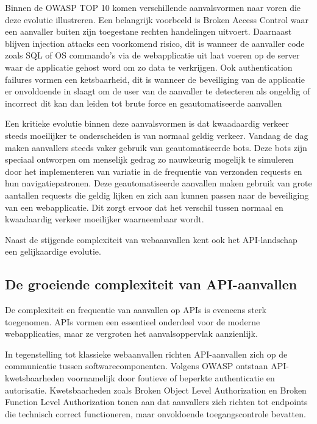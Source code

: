 Binnen de OWASP TOP 10 komen verschillende aanvalsvormen naar voren die deze evolutie illustreren. Een belangrijk voorbeeld is Broken Access Control waar een aanvaller buiten zijn toegestane rechten handelingen uitvoert. Daarnaast blijven injection attacks een voorkomend risico, dit is wanneer de aanvaller code zoals SQL of OS commando's via de webapplicatie uit laat voeren op de server waar de applicatie gehost word om zo data te verkrijgen. Ook authentication failures vormen een ketsbaarheid, dit is wanneer de beveiliging van de applicatie er onvoldoende in slaagt om de user van de aanvaller te detecteren als ongeldig of incorrect dit kan dan leiden tot brute force en geautomatiseerde aanvallen\autocite{OWASP2026}%

Een kritieke evolutie binnen deze aanvalsvormen is dat kwaadaardig verkeer steeds moeilijker te onderscheiden is van normaal geldig verkeer. Vandaag de dag maken aanvallers steeds vaker gebruik van geautomatiseerde bots. Deze bots zijn speciaal ontworpen om menselijk gedrag zo nauwkeurig mogelijk te simuleren door het implementeren van variatie in de frequentie van verzonden requests en hun navigatiepatronen. Deze geautomatiseerde aanvallen maken gebruik van grote aantallen requests die geldig lijken en zich aan kunnen passen naar de beveiliging van een webapplicatie. Dit zorgt ervoor dat het verschil tussen normaal en kwaadaardig verkeer moeilijker waarneembaar wordt\autocite{F52026}.%

Naast de stijgende complexiteit van webaanvallen kent ook het API-landschap een gelijkaardige evolutie. 
\subsection{De groeiende complexiteit van API-aanvallen}
\label{subsec:api-aanvallen-complexiteit}

De complexiteit en frequentie van aanvallen op APIs is eveneens sterk toegenomen. APIs vormen een essentieel onderdeel voor de moderne webapplicaties, maar ze vergroten het aanvalsoppervlak aanzienlijk\autocite{Akamai2025}. %

In tegenstelling tot klassieke webaanvallen richten API-aanvallen zich op de communicatie tussen softwarecomponenten. Volgens OWASP ontstaan API-kwetsbaarheden voornamelijk door foutieve of beperkte authenticatie en autorisatie. Kwetsbaarheden zoals Broken Object Level Authorization en Broken Function Level Authorization tonen aan dat aanvallers zich richten tot endpoints die technisch correct functioneren, maar onvoldoende toegangscontrole bevatten.

